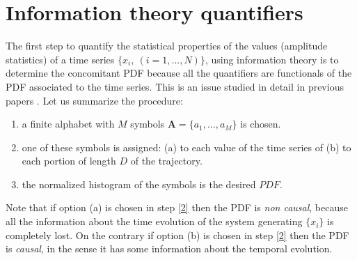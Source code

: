 \section{Information theory quantifiers}\label{sec:quant}
The first step to quantify the statistical properties of the values (amplitude statistics) of a time series $\{x_i,~(i=1,...,N)\}$, using information theory is to determine the concomitant PDF because all the quantifiers are functionals of the PDF associated to the time series. This is an issue studied in detail in previous papers \cite{aka varios}. Let us summarize the procedure:
\begin{enumerate} 
\item \label{1} a finite alphabet  with $M$ symbols $\mathbf{ A}=\{a_1,...,a_M\}$ is chosen. 
\item \label{2} one of these symbols is assigned: (a) to each value of the time series of (b) to each portion of length $D$ of the trajectory. 
\item \label{3} the normalized histogram of the symbols is the desired $PDF$.
\end{enumerate}

Note that if option (a) is chosen in step \ref{2} then the PDF is \textit{non causal}, because all the information about the time evolution of the system generating $\{x_i\}$  is completely lost. On the contrary if option (b) is chosen in step \ref{2} then the PDF is \textit{causal}, in the sense it has some information about the temporal evolution.

